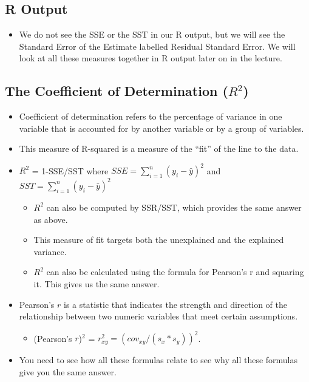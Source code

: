 \documentclass[
  letterpaper,
  DIV=11,
  numbers=noendperiod]{scrreprt}
\providecommand{\tightlist}{%
  \setlength{\itemsep}{0pt}\setlength{\parskip}{0pt}}\usepackage{longtable,booktabs,array}
\begin{document}
\subsection{R Output}\label{r-output}

\begin{itemize}
\tightlist
\item
  We do not see the SSE or the SST in our R output, but we will see the
  Standard Error of the Estimate labelled Residual Standard Error. We
  will look at all these measures together in R output later on in the
  lecture.
\end{itemize}

\subsection{\texorpdfstring{The Coefficient of Determination
(\(R^2\))}{The Coefficient of Determination (R\^{}2)}}\label{the-coefficient-of-determination-r2}

\begin{itemize}
\item
  Coefficient of determination refers to the percentage of variance in
  one variable that is accounted for by another variable or by a group
  of variables.
\item
  This measure of R-squared is a measure of the ``fit'' of the line to
  the data.
\item
  \(R^2\) = 1-SSE/SST where \(SSE = \sum^n_{i=1}(y_i - \hat{y})^2\) and
  \(SST = \sum^n_{i=1}(y_i - \bar{y})^2\)

  \begin{itemize}
  \tightlist
  \item
    \(R^2\) can also be computed by SSR/SST, which provides the same
    answer as above.
  \item
    This measure of fit targets both the unexplained and the explained
    variance.
  \item
    \(R^2\) can also be calculated using the formula for Pearson's r and
    squaring it. This gives us the same answer.
  \end{itemize}
\item
  Pearson's \(r\) is a statistic that indicates the strength and
  direction of the relationship between two numeric variables that meet
  certain assumptions.

  \begin{itemize}
  \tightlist
  \item
    (Pearson's \(r\))\(^2\) = \(r^2_{xy} = (cov_{xy}/(s_x*s_y))^2\).
  \end{itemize}
\item
  You need to see how all these formulas relate to see why all these
  formulas give you the same answer.
\end{itemize}
\end{document}

